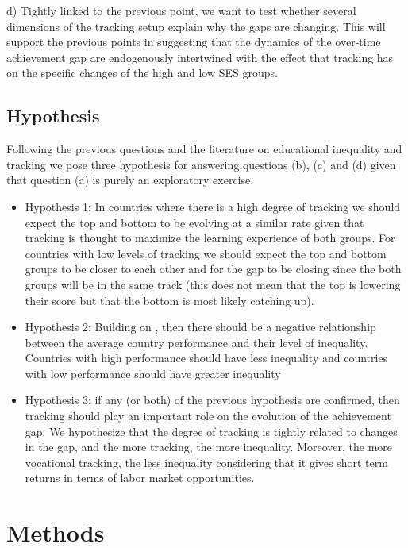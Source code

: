 \documentclass[11pt, a4paper]{article}\usepackage[]{graphicx}\usepackage[]{color}
\begin{document}
d) Tightly linked to the previous point, we want to test whether several dimensions of the tracking setup explain why the gaps are changing. This will support the previous points in suggesting that the dynamics of the over-time achievement gap are endogenously intertwined with the effect that tracking has on the specific changes of the high and low SES groups.

\subsection{Hypothesis}

Following the previous questions and the literature on educational inequality and tracking we pose three hypothesis for answering questions (b), (c) and (d) given that question (a) is purely an exploratory exercise.

\begin{itemize}
\item Hypothesis 1: In countries where there is a high degree of tracking we should expect the top and bottom to be evolving at a similar rate given that tracking is thought to maximize the learning experience of both groups. For countries with low levels of tracking we should expect the top and bottom groups to be closer to each other and for the gap to be closing since the both groups will be in the same track (this does not mean that the top is lowering their score but that the bottom is most likely catching up).

\item Hypothesis 2: Building on \citet{werfhorst_mijs}, then there should be a negative relationship between the average country performance and their level of inequality. Countries with high performance should have less inequality and countries with low performance should have greater inequality

\item Hypothesis 3: if any (or both) of the previous hypothesis are confirmed, then tracking should play an important role on the evolution of the achievement gap. We hypothesize that the degree of tracking is tightly related to changes in the gap, and the more tracking, the more inequality. Moreover, the more vocational tracking, the less inequality considering that it gives short term returns in terms of labor market opportunities.
\end{itemize}

\section{Methods}
\end{document}
